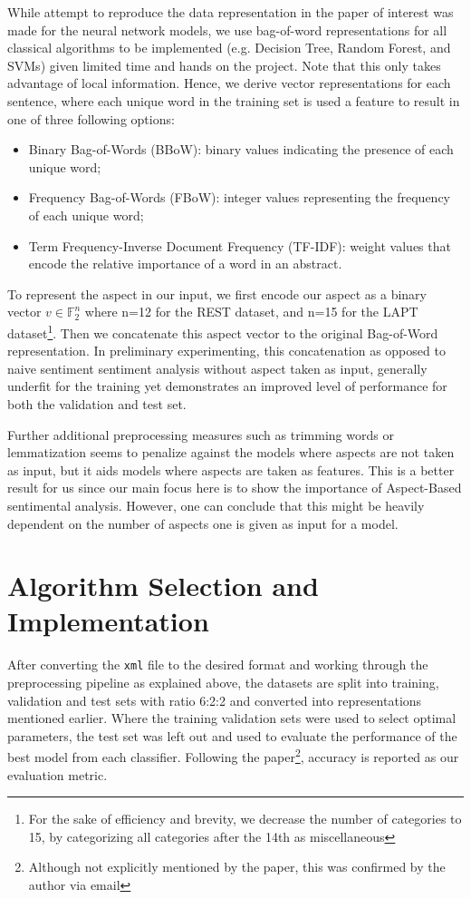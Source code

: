 \documentclass[comsoc,conference]{IEEEtran}
\begin{document}
While attempt to reproduce the data representation in the paper of interest was made for the neural network models, we use bag-of-word representations for all classical algorithms to be implemented (e.g. Decision Tree, Random Forest, and SVMs) given limited time and hands on the project. Note that this only takes advantage of local information. Hence, we derive vector representations for each sentence, where each unique word in the training set is used a feature to result in one of three following options:
\begin{itemize}
    \item Binary Bag-of-Words (BBoW): binary values indicating the presence of each unique word;
    \item Frequency Bag-of-Words (FBoW): integer values representing the frequency of each unique word;
    \item Term Frequency-Inverse Document Frequency (TF-IDF): weight values that encode the relative importance of a word in an abstract.
\end{itemize}
To represent the aspect in our input, we first encode our aspect as a binary vector $v \in \mathbb{F}_2^n$ where n=12 for the REST dataset, and n=15 for the LAPT dataset\footnote{For the sake of efficiency and brevity, we decrease the number of categories to 15, by categorizing all categories after the 14th as miscellaneous}. Then we concatenate this aspect vector to the original Bag-of-Word representation. In preliminary experimenting, this concatenation as opposed to naive sentiment sentiment analysis without aspect taken as input, generally underfit for the training yet demonstrates an improved level of performance for both the validation and test set.

Further additional preprocessing measures such as trimming words or lemmatization seems to penalize against the models where aspects are not taken as input, but it aids models where aspects are taken as features. This is a better result for us since our main focus here is to show the importance of Aspect-Based sentimental analysis. However, one can conclude that this might be heavily dependent on the number of aspects one is given as input for a model.

\section{Algorithm Selection and Implementation}

After converting the \texttt{xml} file to the desired format and working through the preprocessing pipeline as explained above, the datasets are split into training, validation and test sets with ratio 6:2:2 and converted into representations mentioned earlier. Where the training validation sets were used to select optimal parameters, the test set was left out and used to evaluate the performance of the best model from each classifier. Following the paper\footnote{Although not explicitly mentioned by the paper, this was confirmed by the author via email}, accuracy is reported as our evaluation metric. %
\end{document}
